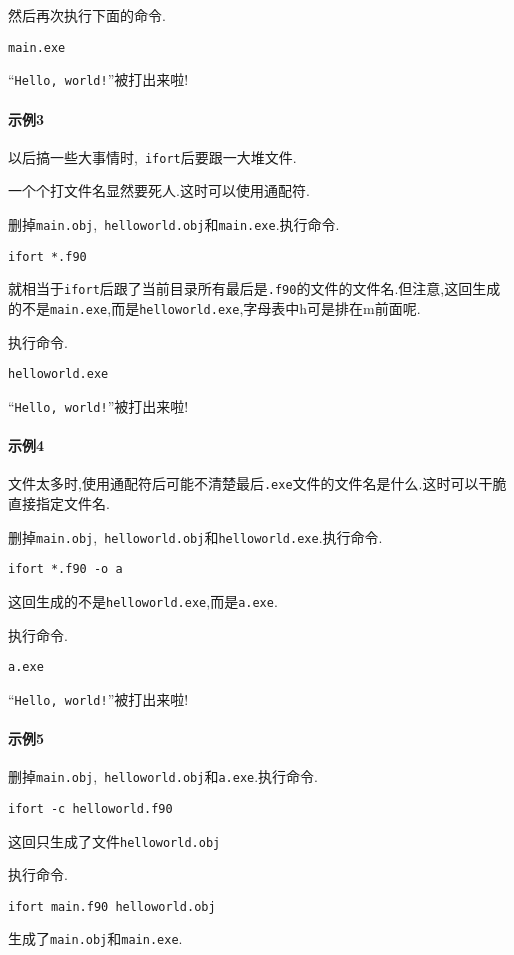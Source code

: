 然后再次执行下面的命令.
\begin{verbatim}
main.exe
\end{verbatim}
``\verb|Hello, world!|''被打出来啦!

\paragraph{示例3}
以后搞一些大事情时,~\verb|ifort|后要跟一大堆文件.

一个个打文件名显然要死人.这时可以使用通配符.

删掉\verb|main.obj|,~\verb|helloworld.obj|和\verb|main.exe|.执行命令.
\begin{verbatim}
ifort *.f90
\end{verbatim}
就相当于\verb|ifort|后跟了当前目录所有最后是\verb|.f90|的文件的文件名.但注意,这回生成的不是\verb|main.exe|,而是\verb|helloworld.exe|,字母表中h可是排在m前面呢.

执行命令.
\begin{verbatim}
helloworld.exe
\end{verbatim}
``\verb|Hello, world!|''被打出来啦!

\paragraph{示例4}
文件太多时,使用通配符后可能不清楚最后\verb|.exe|文件的文件名是什么.这时可以干脆直接指定文件名.

删掉\verb|main.obj|,~\verb|helloworld.obj|和\verb|helloworld.exe|.执行命令.
\begin{verbatim}
ifort *.f90 -o a
\end{verbatim}
这回生成的不是\verb|helloworld.exe|,而是\verb|a.exe|.

执行命令.
\begin{verbatim}
a.exe
\end{verbatim}
``\verb|Hello, world!|''被打出来啦!

\paragraph{示例5}
删掉\verb|main.obj|,~\verb|helloworld.obj|和\verb|a.exe|.执行命令.
\begin{verbatim}
ifort -c helloworld.f90
\end{verbatim}
这回只生成了文件\verb|helloworld.obj|

执行命令.
\begin{verbatim}
ifort main.f90 helloworld.obj
\end{verbatim}
生成了\verb|main.obj|和\verb|main.exe|.

